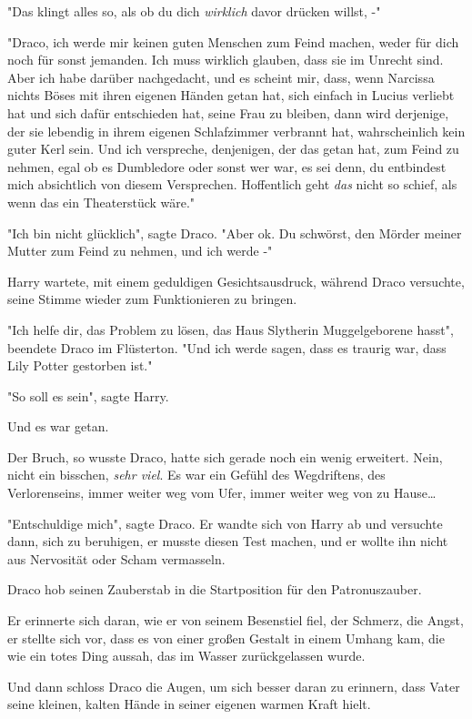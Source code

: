 {"Das klingt alles so, als ob du dich \emph{wirklich} davor drücken willst, -"

"Draco, ich werde mir keinen guten Menschen zum Feind machen, weder für dich noch für sonst jemanden. Ich muss wirklich glauben, dass sie im Unrecht sind. Aber ich habe darüber nachgedacht, und es scheint mir, dass, wenn Narcissa nichts Böses mit ihren eigenen Händen getan hat, sich einfach in Lucius verliebt hat und sich dafür entschieden hat, seine Frau zu bleiben, dann wird derjenige, der sie lebendig in ihrem eigenen Schlafzimmer verbrannt hat, wahrscheinlich kein guter Kerl sein. Und ich verspreche, denjenigen, der das getan hat, zum Feind zu nehmen, egal ob es Dumbledore oder sonst wer war, es sei denn, du entbindest mich absichtlich von diesem Versprechen. Hoffentlich geht \emph{das} nicht so schief, als wenn das ein Theaterstück wäre."

"Ich bin nicht glücklich", sagte Draco. "Aber ok. Du schwörst, den Mörder meiner Mutter zum Feind zu nehmen, und ich werde -"

Harry wartete, mit einem geduldigen Gesichtsausdruck, während Draco versuchte, seine Stimme wieder zum Funktionieren zu bringen.

"Ich helfe dir, das Problem zu lösen, das Haus Slytherin Muggelgeborene hasst", beendete Draco im Flüsterton. "Und ich werde sagen, dass es traurig war, dass Lily Potter gestorben ist."

"So soll es sein", sagte Harry.

Und es war getan.

Der Bruch, so wusste Draco, hatte sich gerade noch ein wenig erweitert. Nein, nicht ein bisschen, \emph{sehr viel}. Es war ein Gefühl des Wegdriftens, des Verlorenseins, immer weiter weg vom Ufer, immer weiter weg von zu Hause…

"Entschuldige mich", sagte Draco. Er wandte sich von Harry ab und versuchte dann, sich zu beruhigen, er musste diesen Test machen, und er wollte ihn nicht aus Nervosität oder Scham vermasseln.

Draco hob seinen Zauberstab in die Startposition für den Patronuszauber.

Er erinnerte sich daran, wie er von seinem Besenstiel fiel, der Schmerz, die Angst, er stellte sich vor, dass es von einer großen Gestalt in einem Umhang kam, die wie ein totes Ding aussah, das im Wasser zurückgelassen wurde.

Und dann schloss Draco die Augen, um sich besser daran zu erinnern, dass Vater seine kleinen, kalten Hände in seiner eigenen warmen Kraft hielt.

}
